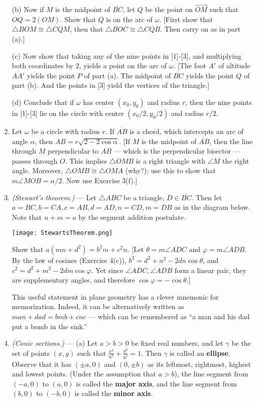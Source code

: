 \documentclass[leqno]{book}
\begin{document}
\begin{enumerate}
(b) Now if $M$ is the midpoint of $\overline{BC}$, let $Q$ be the point on $\overset{\longrightarrow}{OM}$ such that $OQ=2(OM)$.  Show that $Q$ is on the arc of $\omega$.  [First show that $\triangle BOM\cong\triangle CQM$, then that $\triangle BOC\cong\triangle CQB$.  Then carry on as in part (a).]

(c) Now show that taking any of the nine points in [1]-[3], and multiplying both coordinates by $2$, yields a point on the arc of $\omega$.  [The foot $A'$ of altitude $\overline{AA'}$ yields the point $P$ of part (a).  The midpoint of $\overline{BC}$ yields the point $Q$ of part (b).  And the points in [3] yield the vertices of the triangle.]

(d) Conclude that if $\omega$ has center $(x_0,y_0)$ and radius $r$, then the nine points in [1]-[3] lie on the circle with center $(x_0/2,y_0/2)$ and radius $r/2$.

\item Let $\omega$ be a circle with radius $r$.  If $\overline{AB}$ is a chord, which intercepts an arc of angle $\alpha$, then $AB=r\sqrt{2-2\cos\alpha}$.  [If $M$ is the midpoint of $\overline{AB}$, then the line through $M$ perpendicular to $\overline{AB}$ \---- which is the perpendicular bisector \---- passes through $O$.  This implies $\triangle OMB$ is a right triangle with $\angle M$ the right angle.  Moreover, $\triangle OMB\cong\triangle OMA$ (why?); use this to show that $m\angle MOB=\alpha/2$.  Now use Exercise 3(f).]

\item\emph{(Stewart's theorem.)} \---- Let $\triangle ABC$ be a triangle, $D\in\overline{BC}$.  Then let $a=BC,b=CA,c=AB,d=AD,n=CD,m=DB$ as in the diagram below.  Note that $n+m=a$ by the segment addition postulate.
\begin{center}\texttt{[image: StewartsTheorem.png]}\end{center}
Show that $a(mn+d^2)=b^2m+c^2n$.  [Let $\theta=m\angle ADC$ and $\varphi=m\angle ADB$.  By the law of cosines (Exercise 4(c)), $b^2=d^2+n^2-2dn\cos\theta$, and $c^2=d^2+m^2-2dm\cos\varphi$.  Yet since $\angle ADC,\angle ADB$ form a linear pair, they are supplementary angles, and therefore $\cos\varphi=-\cos\theta$.]

This useful statement in plane geometry has a clever mnemonic for memorization.  Indeed, it can be alternatively written as $man+dad=bmb+cnc$ \---- which can be remembered as ``a man and his dad put a bomb in the sink.''

\item\emph{(Conic sections.)} \---- (a) Let $a>b>0$ be fixed real numbers, and let $\gamma$ be the set of points $(x,y)$ such that $\frac{x^2}{a^2}+\frac{y^2}{b^2}=1$.  Then $\gamma$ is called an \textbf{ellipse}.  Observe that it has $(\pm a,0)$ and $(0,\pm b)$ as its leftmost, rightmost, highest and lowest points.  (Under the assumption that $a>b$), the line segment from $(-a,0)$ to $(a,0)$ is called the \textbf{major axis}, and the line segment from $(b,0)$ to $(-b,0)$ is called the \textbf{minor axis}.


\end{enumerate}
\end{document}
